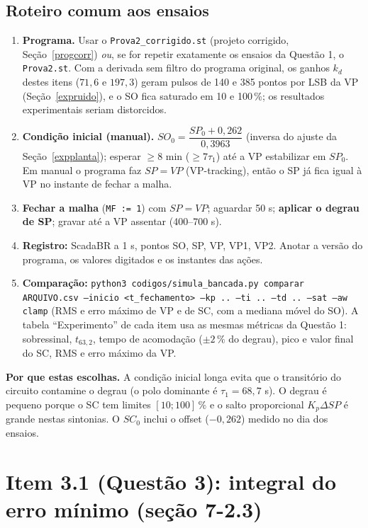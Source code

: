 \subsection{Roteiro comum aos ensaios}\label{roteirocomum}
\begin{enumerate}
\item \textbf{Programa.} Usar o \texttt{Prova2\_corrigido.st} (projeto corrigido, Seção~\ref{progcorr}) \emph{ou}, se for repetir exatamente os ensaios da Questão 1, o \texttt{Prova2.st}. Com a derivada sem filtro do programa original, os ganhos $k_d$ destes itens ($71{,}6$ e $197{,}3$) geram pulsos de 140 e 385 pontos por LSB da VP (Seção~\ref{expruido}), e o SO fica saturado em 10 e 100\,\%; os resultados experimentais seriam distorcidos.
\item \textbf{Condição inicial (manual).} $SO_0=\dfrac{SP_0+0{,}262}{0{,}3963}$ (inversa do ajuste da Seção~\ref{expplanta}); esperar $\ge8$ min ($\ge7\tau_1$) até a VP estabilizar em $SP_0$. Em manual o programa faz $SP=VP$ (VP-tracking), então o SP já fica igual à VP no instante de fechar a malha.
\item \textbf{Fechar a malha} (\texttt{MF := 1}) com $SP=VP$; aguardar 50 s; \textbf{aplicar o degrau de SP}; gravar até a VP assentar (400--700 s).
\item \textbf{Registro:} ScadaBR a 1 s, pontos SO, SP, VP, VP1, VP2. Anotar a versão do programa, os valores digitados e os instantes das ações.
\item \textbf{Comparação:} \texttt{python3 codigos/simula\_bancada.py comparar ARQUIVO.csv --inicio <t\_fechamento> --kp .. --ti .. --td .. --sat --aw clamp} (RMS e erro máximo de VP e de SC, com a mediana móvel do SO). A tabela ``Experimento'' de cada item usa as mesmas métricas da Questão 1: sobressinal, $t_{63,2}$, tempo de acomodação ($\pm2\,\%$ do degrau), pico e valor final do SC, RMS e erro máximo da VP.
\end{enumerate}
\begin{just}\textbf{Por que estas escolhas.} A condição inicial longa evita que o transitório do circuito contamine o degrau (o polo dominante é $\tau_1=68{,}7$ s). O degrau é pequeno porque o SC tem limites $[10;100]\,\%$ e o salto proporcional $K_p\Delta SP$ é grande nestas sintonias. O $SC_0$ inclui o offset ($-0{,}262$) medido no dia dos ensaios.\end{just}

\section{Item 3.1 (Questão 3): integral do erro mínimo (seção 7-2.3)}\label{q31exp}
